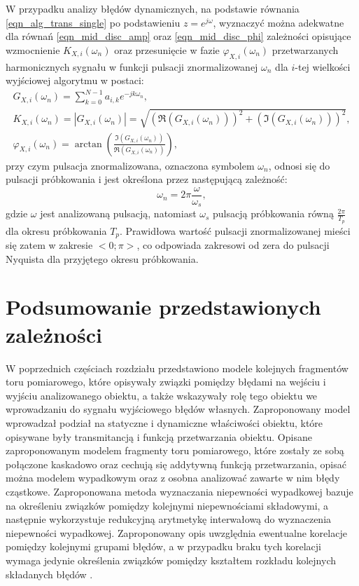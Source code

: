 W przypadku analizy błędów dynamicznych, na podstawie równania \eqref{eqn_alg_trans_single} po podstawieniu $z = e^{j\omega}$, wyznaczyć można adekwatne dla równań \eqref{eqn_mid_disc_amp} oraz \eqref{eqn_mid_disc_phi} zależności opisujące wzmocnienie $K_{X,i}(\omega_{n})$ oraz przesunięcie w fazie $\varphi_{X,i}(\omega_{n})$ przetwarzanych harmonicznych sygnału w funkcji pulsacji znormalizowanej $\omega_{n}$ dla $i$-tej wielkości wyjściowej algorytmu w postaci:
\begin{gather}
G_{X,i} \left( \omega_{n} \right) = \sum _{k = 0} ^{N-1} a_{i,k} e^{-j k \omega_{n}} \label{eqn_alg_trans_norm}, \\
K_{X,i} \left( \omega_{n} \right) = \left| G_{X,i} \left( \omega_{n} \right) \right| = \sqrt{\left( \Re \left( G_{X,i} \left( \omega_{n} \right) \right) \right)^{2} + \left( \Im \left( G_{X,i} \left( \omega_{n} \right) \right) \right)^{2}} \label{eqn_alg_trans_amp}, \\
\varphi_{X,i} \left( \omega_{n} \right) = \arctan \left( \frac{\Im \left( G_{X,i} \left( \omega_{n} \right) \right)}{\Re \left( G_{X,i} \left( \omega_{n} \right) \right)} \right) \label{eqn_alg_trans_phi},
\end{gather}
przy czym pulsacja znormalizowana, oznaczona symbolem $\omega_{n}$, odnosi się do pulsacji próbkowania i jest określona przez następującą zależność:
\begin{equation}
\omega_{n} = 2\pi \frac{\omega}{\omega_{s}} \label{eqn_puls_norm},
\end{equation}
gdzie $\omega$ jest analizowaną pulsacją, natomiast $\omega_{s}$ pulsacją próbkowania równą $\frac{2 \pi}{T_{p}}$ dla okresu próbkowania $T_{p}$. Prawidłowa wartość pulsacji znormalizowanej mieści się zatem w zakresie $<0;\pi>$, co odpowiada zakresowi od zera do pulsacji Nyquista dla przyjętego okresu próbkowania.

\section{Podsumowanie przedstawionych zależności}

W poprzednich częściach rozdziału przedstawiono modele kolejnych fragmentów toru pomiarowego, które opisywały związki pomiędzy błędami na wejściu i wyjściu analizowanego obiektu, a także wskazywały rolę tego obiektu we wprowadzaniu do sygnału wyjściowego błędów własnych. Zaproponowany model wprowadzał podział na statyczne i dynamiczne właściwości obiektu, które opisywane były transmitancją i funkcją przetwarzania obiektu. Opisane zaproponowanym modelem fragmenty toru pomiarowego, które zostały ze sobą połączone kaskadowo oraz cechują się addytywną funkcją przetwarzania, opisać można modelem wypadkowym oraz z osobna analizować zawarte w nim błędy cząstkowe. Zaproponowana metoda wyznaczania niepewności wypadkowej bazuje na określeniu związków pomiędzy kolejnymi niepewnościami składowymi, a następnie wykorzystuje redukcyjną arytmetykę interwałową do wyznaczenia niepewności wypadkowej. Zaproponowany opis uwzględnia ewentualne korelacje pomiędzy kolejnymi grupami błędów, a w przypadku braku tych korelacji wymaga jedynie określenia związków pomiędzy kształtem rozkładu kolejnych składanych błędów \cite{jakubiec_reductive, batko_uncertainty}.

